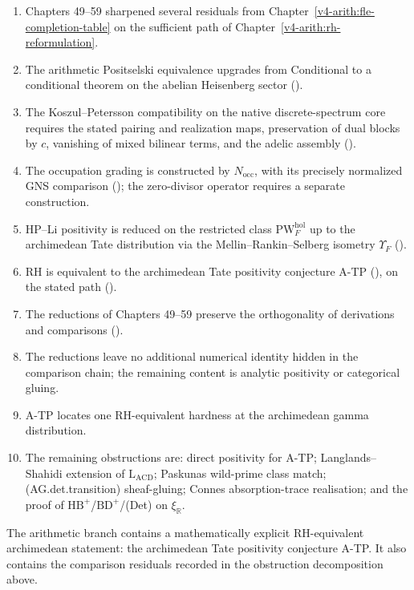 \begin{enumerate}
\item Chapters 49--59 sharpened several residuals from
Chapter~\ref{v4-arith:fle-completion-table} on the sufficient path
of Chapter~\ref{v4-arith:rh-reformulation}.
\item The arithmetic Positselski equivalence upgrades from
Conditional to a conditional theorem on the abelian Heisenberg sector
().
\item The Koszul--Petersson compatibility on the native
discrete-spectrum core requires the stated pairing and realization maps,
preservation of dual blocks by $c$, vanishing of mixed bilinear terms,
and the adelic assembly
().
\item The occupation grading is constructed by \(N_{\mathrm{occ}}\),
with its precisely normalized GNS comparison
(); the zero-divisor
operator requires a separate construction.
\item HP--Li positivity is reduced on the restricted class
\(\mathrm{PW}^{\mathrm{hol}}_{F}\) up to the archimedean Tate
distribution via the Mellin--Rankin--Selberg isometry \(\Upsilon_{F}\)
().
\item RH is equivalent to the archimedean Tate positivity conjecture
A-TP (),
on the stated path
().
\item The reductions of Chapters 49--59 preserve the orthogonality of
derivations and comparisons
().
\item The reductions leave no additional numerical identity hidden in
the comparison chain; the remaining content is analytic positivity or
categorical gluing.
\item A-TP locates one RH-equivalent hardness at the archimedean gamma
distribution.
\item The remaining obstructions are: direct positivity for A-TP;
Langlands--Shahidi extension of \(\mathrm{L}_{\mathrm{ACD}}\);
Paskunas wild-prime class match; (AG.det.transition) sheaf-gluing;
Connes absorption-trace realisation; and the proof of
\(\mathrm{HB}^{+}\)/\(\mathrm{BD}^{+}\)/(Det) on \(\xi_{\mathbb{R}}\).
\end{enumerate}

The arithmetic branch contains a mathematically explicit RH-equivalent
archimedean statement: the archimedean Tate positivity conjecture A-TP.
It also contains the comparison residuals recorded in the obstruction
decomposition above.


